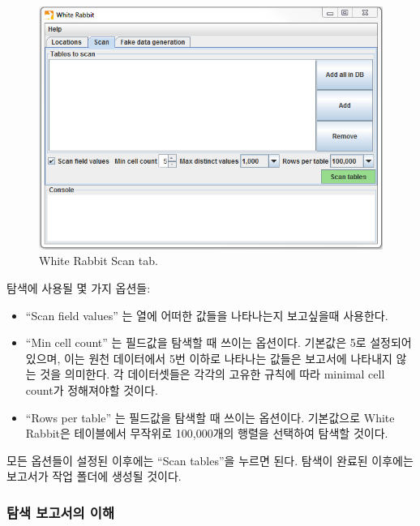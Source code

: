 \documentclass[11pt]{book}
\providecommand{\tightlist}{%
  \setlength{\itemsep}{0pt}\setlength{\parskip}{0pt}}
\theoremstyle{definition}
\theoremstyle{definition}
\theoremstyle{definition}
\theoremstyle{remark}
\begin{document}
\begin{figure}

{\centering \includegraphics[width=1\linewidth]{images/ExtractTransformLoad/WhiteRabbitAddTables} 

}

\caption{White Rabbit Scan tab.}\label{fig:WhiteRabbitAddTables}
\end{figure}

탐색에 사용될 몇 가지 옵션들:

\begin{itemize}
\tightlist
\item
  ``Scan field values'' 는 열에 어떠한 값들을 나타나는지 보고싶을때
  사용한다.
\item
  ``Min cell count'' 는 필드값을 탐색할 때 쓰이는 옵션이다. 기본값은 5로
  설정되어 있으며, 이는 원천 데이터에서 5번 이하로 나타나는 값들은
  보고서에 나타내지 않는 것을 의미한다. 각 데이터셋들은 각각의 고유한
  규칙에 따라 minimal cell count가 정해져야할 것이다.
\item
  ``Rows per table'' 는 필드값을 탐색할 때 쓰이는 옵션이다. 기본값으로
  White Rabbit은 테이블에서 무작위로 100,000개의 행렬을 선택하여 탐색할
  것이다.
\end{itemize}

모든 옵션들이 설정된 이후에는 ``Scan tables''을 누르면 된다. 탐색이
완료된 이후에는 보고서가 작업 폴더에 생성될 것이다.

\subsubsection*{탐색 보고서의 이해}\label{--}
\end{document}
